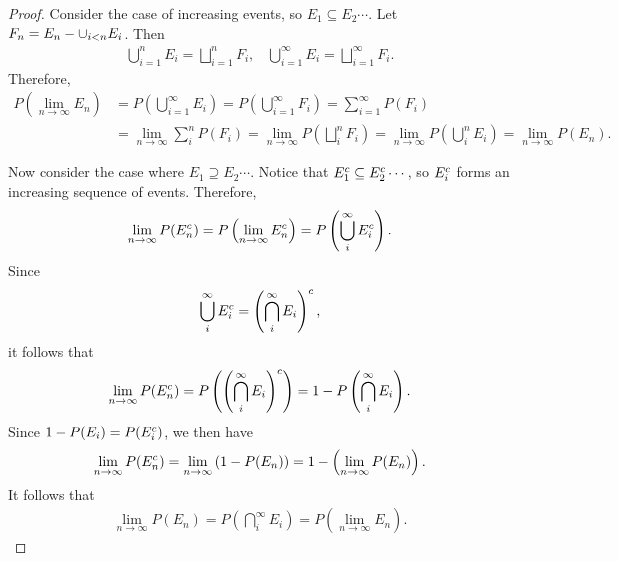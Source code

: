 \begin{proof}
    Consider the case of increasing events, so $E_1 \subseteq E_2 \cdots$. Let $F_n = E_n - \cup_{i < n}E_i$. Then
    \begin{align*}
        \bigcup_{i=1}^{n}E_i = \bigsqcup_{i=1}^{n}F_i,\;\;\;\bigcup_{i=1}^{\infty}E_i = \bigsqcup_{i=1}^{\infty}F_i.
    \end{align*}
    Therefore,
    \begin{align*}
        P\left(\lim_{n \to \infty} E_n\right) &= P\left(\bigcup_{i=1}^{\infty}E_i\right) = P\left(\bigcup_{i=1}^{\infty}F_i\right) = \sum_{i =1}^{\infty}P(F_i) \\
        &= \lim_{n \to \infty}\sum_{i}^{n}P(F_i) = \lim_{n \to \infty} P\left(\bigsqcup_{i}^{n}F_i\right) = \lim_{n \to \infty} P\left(\bigcup_{i}^{n}E_i\right) = \lim_{n \to \infty}P(E_n).
    \end{align*}

    Now consider the case where $E_1 \supseteq E_2 \cdots$. Notice that $E_1^{c} \subseteq E_2^{c} \cdots$, so $E_i^{c}$ forms an increasing sequence of events. Therefore,
    \begin{align*}
        \lim_{n \to \infty}P(E_n^{c}) = P\left(\lim_{n \to \infty}E_n^{c}\right) = P\left(\bigcup_{i}^{\infty}E_i^{c}\right).
    \end{align*}
    Since
    \begin{align*}
        \bigcup_{i}^{\infty}E_i^{c} = \left(\bigcap_{i}^{\infty}E_i\right)^{c},
    \end{align*}
    it follows that
    \begin{align*}
        \lim_{n \to \infty}P(E_n^{c}) = P\left(\left(\bigcap_{i}^{\infty}E_i\right)^{c}\right) = 1 - P\left(\bigcap_{i}^{\infty}E_i\right).
    \end{align*}
    Since $1 - P(E_i) = P(E_i^{c})$, we then have
    \begin{align*}
        \lim_{n \to \infty}P(E_n^{c}) = \lim_{n \to \infty}\left(1 - P(E_n)\right) = 1 - \left(\lim_{n \to \infty}P(E_n)\right).
    \end{align*}
    It follows that
    \begin{align*}
        \lim_{n \to \infty}P(E_n) = P\left(\bigcap_{i}^{\infty}E_i\right) = P\left(\lim_{n \to \infty}E_n\right).
    \end{align*}
\end{proof}

